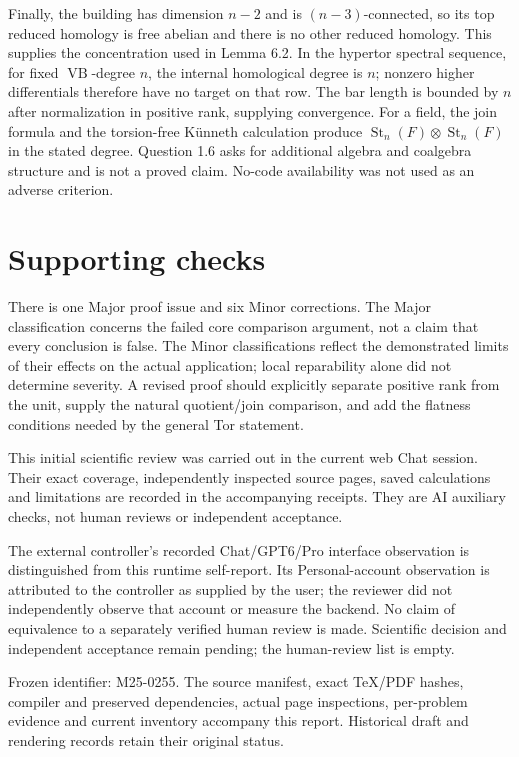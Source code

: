 \documentclass[10pt]{article}
\begin{document}
Finally, the building has dimension \(n-2\) and is \((n-3)\)-connected, so its top reduced homology is free abelian and there is no other reduced homology. This supplies the concentration used in Lemma 6.2. In the hypertor spectral sequence, for fixed \(\operatorname{VB}\)-degree \(n\), the internal homological degree is \(n\); nonzero higher differentials therefore have no target on that row. The bar length is bounded by \(n\) after normalization in positive rank, supplying convergence. For a field, the join formula and the torsion-free Künneth calculation produce \(\operatorname{St}_n(F)\otimes\operatorname{St}_n(F)\) in the stated degree. Question 1.6 asks for additional algebra and coalgebra structure and is not a proved claim. No-code availability was not used as an adverse criterion.\par
\section*{Supporting checks}
There is one Major proof issue and six Minor corrections. The Major classification concerns the failed core comparison argument, not a claim that every conclusion is false. The Minor classifications reflect the demonstrated limits of their effects on the actual application; local reparability alone did not determine severity. A revised proof should explicitly separate positive rank from the unit, supply the natural quotient/join comparison, and add the flatness conditions needed by the general Tor statement.\par
This initial scientific review was carried out in the current web Chat session. Their exact coverage, independently inspected source pages, saved calculations and limitations are recorded in the accompanying receipts. They are AI auxiliary checks, not human reviews or independent acceptance.\par
The external controller’s recorded Chat/GPT6/Pro interface observation is distinguished from this runtime self-report. Its Personal-account observation is attributed to the controller as supplied by the user; the reviewer did not independently observe that account or measure the backend. No claim of equivalence to a separately verified human review is made. Scientific decision and independent acceptance remain pending; the human-review list is empty.\par
Frozen identifier: M25-0255. The source manifest, exact TeX/PDF hashes, compiler and preserved dependencies, actual page inspections, per-problem evidence and current inventory accompany this report. Historical draft and rendering records retain their original status.\par
\end{document}
